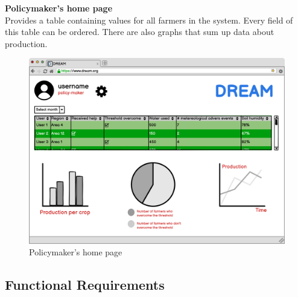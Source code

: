 \textbf{Policymaker's home page} \\
Provides a table containing values for all farmers in the system. Every field of this table can be ordered.
\newline There are also graphs that sum up data about production.
\begin{figure}[H]
    \centering
    \includegraphics[scale=0.40]{Images/policymakerHomePage.png}
    \caption{Policymaker's home page}
\end{figure}


\subsection{Functional Requirements}
